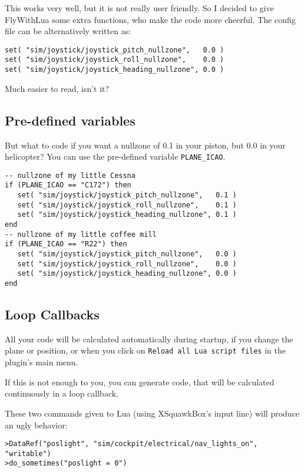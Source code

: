 \documentclass[11pt,parskip=half,a4paper]{scrartcl}
\begin{document}
This works very well, but it is not really user friendly. So I decided to give FlyWithLua some extra functions, who make the code more cheerful. The config file can be alternatively written as:

\begin{lstlisting}
set( "sim/joystick/joystick_pitch_nullzone",   0.0 )
set( "sim/joystick/joystick_roll_nullzone",    0.0 )
set( "sim/joystick/joystick_heading_nullzone", 0.0 )
\end{lstlisting}

Much easier to read, isn't it?

\subsection{Pre-defined variables}

But what to code if you want a nullzone of 0.1 in your piston, but 0.0 in your helicopter? You can use the pre-defined variable \verb|PLANE_ICAO|.

\begin{lstlisting}
-- nullzone of my little Cessna
if (PLANE_ICAO == "C172") then
   set( "sim/joystick/joystick_pitch_nullzone",   0.1 )
   set( "sim/joystick/joystick_roll_nullzone",    0.1 )
   set( "sim/joystick/joystick_heading_nullzone", 0.1 )
end
-- nullzone of my little coffee mill
if (PLANE_ICAO == "R22") then
   set( "sim/joystick/joystick_pitch_nullzone",   0.0 )
   set( "sim/joystick/joystick_roll_nullzone",    0.0 )
   set( "sim/joystick/joystick_heading_nullzone", 0.0 )
end
\end{lstlisting}

\subsection{Loop Callbacks}

All your code will be calculated automatically during startup, if you change the plane or position, or when you click on \verb|Reload all Lua script files| in the plugin's main menu.

If this is not enough to you, you can generate code, that will be calculated continuously in a loop callback.

These two commands given to Lua (using XSquawkBox's input line) will produce an ugly behavior:

\verb|>DataRef("poslight", "sim/cockpit/electrical/nav_lights_on", "writable")|\\
\verb|>do_sometimes("poslight = 0")|
\end{document}
